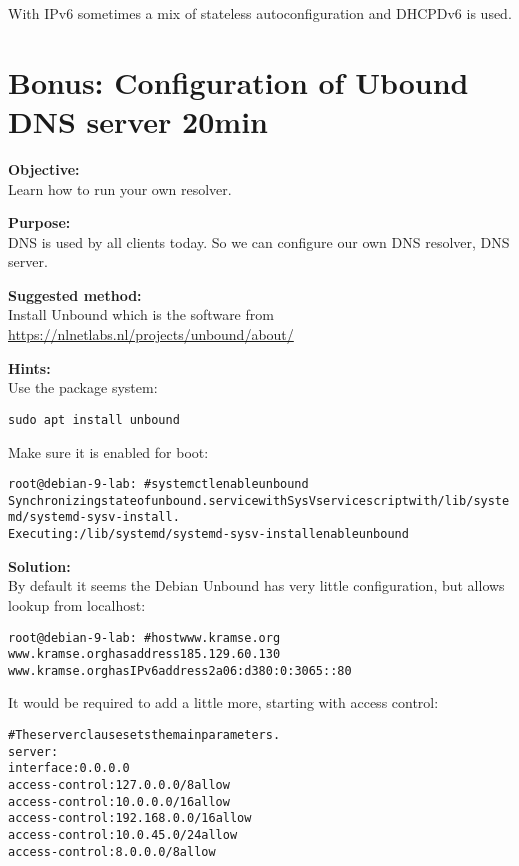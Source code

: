 \documentclass[a4paper,11pt,notitlepage]{report}
\begin{document}
With IPv6 sometimes a mix of stateless autoconfiguration and DHCPDv6 is used.


\chapter{Bonus: Configuration of Ubound DNS server 20min}
\label{ex:dns-config}


{\bf Objective:}\\
Learn how to run your own resolver.

{\bf Purpose:}\\
DNS is used by all clients today. So we can configure our own DNS resolver, DNS server.

{\bf Suggested method:}\\
Install Unbound which is the software from \url{https://nlnetlabs.nl/projects/unbound/about/}

{\bf Hints:}\\
Use the package system:

\verb+sudo apt install unbound+

Make sure it is enabled for boot:

\begin{alltt}\footnotesize
root@debian-9-lab:~# systemctl enable unbound
Synchronizing state of unbound.service with SysV service script with /lib/systemd/systemd-sysv-install.
Executing: /lib/systemd/systemd-sysv-install enable unbound
\end{alltt}

{\bf Solution:}\\
By default it seems the Debian Unbound has very little configuration, but allows lookup from localhost:

\begin{alltt}\footnotesize
root@debian-9-lab:~# host www.kramse.org
www.kramse.org has address 185.129.60.130
www.kramse.org has IPv6 address 2a06:d380:0:3065::80
\end{alltt}

It would be required to add a little more, starting with access control:

\begin{alltt}\footnotesize
# The server clause sets the main parameters.
server:
        interface: 0.0.0.0
        access-control: 127.0.0.0/8 allow
        access-control: 10.0.0.0/16 allow
        access-control: 192.168.0.0/16 allow
        access-control: 10.0.45.0/24 allow
        access-control: 8.0.0.0/8 allow

\end{alltt}
\end{document}
